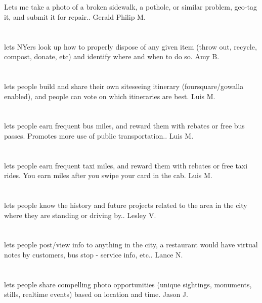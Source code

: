 \section{}Lets me take a photo of a broken sidewalk,  a pothole,  or similar problem,  geo-tag it,  and submit it for repair.. Gerald Philip M.
\section{}lets NYers look up how to properly dispose of any given item (throw out,  recycle,  compost,  donate,  etc) and identify where and when to do so. Amy B.
\section{}  lets people build and share their own siteseeing itinerary (foursquare/gowalla enabled),  and people can vote on which itineraries are best. Luis M.
\section{}lets people earn frequent bus miles,  and reward them with rebates or free bus passes. Promotes more use of public transportation.. Luis M.
\section{}lets people earn frequent taxi miles,  and reward them with rebates or free taxi rides. You earn miles after you swipe your card in the cab. Luis M.
\section{}lets people know the history and future projects related to the area in the city where they are standing or driving by.. Lesley V.
\section{}lets people post/view info to anything in the city,  a restaurant would have virtual notes by customers,  bus stop - service info,  etc.. Lance N.
\section{}lets people share compelling photo opportunities (unique sightings,  monuments,  stills,  realtime events) based on location and time. Jason J.
